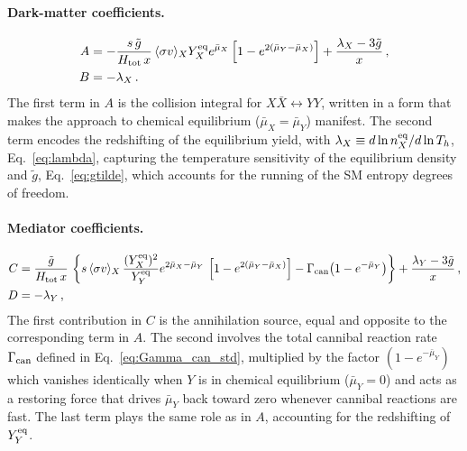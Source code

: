 \documentclass[11pt]{article}
\numberwithin{equation}{section}
\begin{document}
\paragraph{Dark-matter coefficients.}
%
\begin{align}
  A &= -\frac{s\,\tilde g}{H_{\rm tot}\,x}\,\langle\sigma v\rangle_{X} Y_X^{\rm eq}e^{\bar\mu_X}
       \left[1- e^{2(\bar\mu_Y-\bar\mu_X)}
       \right]
       + \frac{\lambda_X - 3\tilde g}{x}\,,
  \label{eq:Acoeff}
  \\
  B &= -\lambda_X\,.
  \label{eq:Bcoeff}
\end{align}
%
The first term in $A$ is the collision integral for $X\bar X \leftrightarrow YY$, written in a form that makes the approach to chemical equilibrium ($\bar\mu_X = \bar\mu_Y$) manifest. The second term encodes the redshifting of the equilibrium yield, with $\lambda_X \equiv d\ln n_X^{\rm eq}/d\ln T_h$, Eq.~\eqref{eq:lambda}, capturing the temperature sensitivity of the equilibrium density and $\tilde g$, Eq.~\eqref{eq:gtilde}, which accounts for the running of the SM entropy degrees of freedom.
 
\paragraph{Mediator coefficients.}
%
\begin{align}
  C &= \frac{\tilde g}{H_{\rm tot}\,x}\,\left\{
       s\,\langle\sigma v\rangle_{X}\, \frac{(Y^{\rm eq}_X)^2}{Y^{\rm eq}_Y}e^{2\bar\mu_X-\bar\mu_Y}\,\left[1-e^{2(\bar\mu_Y-\bar\mu_X)}\right]
       - \Gamma_{\rm can}\bigl(1 - e^{-\bar\mu_Y}\bigr)\right\}
       + \frac{\lambda_Y - 3\tilde g}{x}\,,
  \label{eq:Ccoeff}
  \\
  D &= -\lambda_Y\,,
  \label{eq:Dcoeff}
\end{align}
The first contribution in $C$ is the annihilation source, equal and opposite to the corresponding term in $A$. The second involves the total cannibal reaction rate $\Gamma_{\rm can}$ defined in Eq.~\eqref{eq:Gamma_can_std}, multiplied by the factor $(1 - e^{-\bar\mu_Y})$ which vanishes identically when $Y$ is in chemical equilibrium ($\bar\mu_Y = 0$) and acts as a restoring force that drives $\bar\mu_Y$ back toward zero whenever cannibal reactions are fast. The last term plays the same role as in $A$, accounting for the redshifting of $Y_Y^{\rm eq}$.
 
\end{document}
